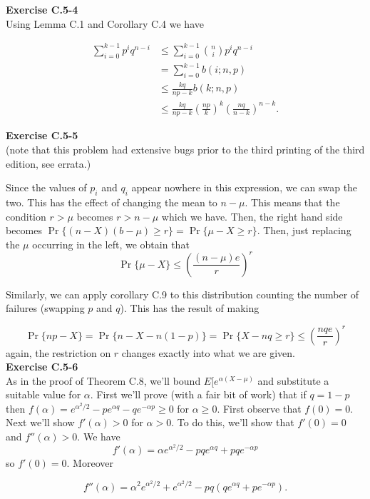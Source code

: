 \documentclass{article}
\begin{document}
\noindent\textbf{Exercise C.5-4}\\

Using Lemma C.1 and Corollary C.4 we have 

\begin{align*} 
\sum_{i=0}^{k-1} p^iq^{n-i} &\leq \sum_{i=0}^{k-1} {n \choose i}p^iq^{n-i} \\
&= \sum_{i=0}^{k-1}b(i;n,p) \\
&\leq \frac{kq}{np-k}b(k;n,p) \\
&\leq \frac{kq}{np-k}\left(\frac{np}{k}\right)^k \left(\frac{nq}{n-k}\right)^{n-k}.
\end{align*}

\noindent\textbf{Exercise C.5-5}\\

(note that this problem had extensive bugs prior to the third printing of the third edition, see errata.)

Since the values of $p_i$ and $q_i$ appear nowhere in this expression, we can swap the two. This has the effect of changing the mean to $n-\mu$. This means that the condition $r>\mu$ becomes $r > n-\mu$ which we have. Then, the right hand side becomes $\Pr\{(n-X) (b-\mu)\ge r\} = \Pr\{\mu-X \ge r\}$. Then, just replacing the $\mu$ occurring in the left, we obtain that
\[
\Pr\{\mu- X\} \le \left(\frac{(n-\mu)e}{r}\right)^r
\]

Similarly, we can apply corollary C.9 to this distribution counting the number of failures (swapping $p$ and $q$). This has the result of making

\[
\Pr\{ np -X\} =  \Pr\{ n - X - n(1-p)\} = \Pr\{X - nq\ge r\}   \le \left(\frac{nqe}{r}\right)^r
\]
again, the restriction on $r$ changes exactly into what we are given.\\

\noindent\textbf{Exercise C.5-6}\\

As in the proof of Theorem C.8, we'll bound $E[e^{\alpha(X-\mu)}$ and substitute a suitable value for $\alpha$.  First we'll prove (with a fair bit of work) that if $q = 1-p$ then $f(\alpha) = e^{\alpha^2/2} - pe^{\alpha q} - qe^{-\alpha p} \geq 0$ for $\alpha \geq 0$.  First observe that $f(0) = 0$.  Next we'll show $f'(\alpha) > 0$ for $\alpha > 0$.  To do this, we'll show that $f'(0) = 0$ and $f''(\alpha) > 0$.  We have
\[f'(\alpha) = \alpha e^{\alpha^2/2} - pqe^{\alpha q} + pqe^{-\alpha p} \]
so $f'(0) = 0$.  Moreover

\[ f''(\alpha) = \alpha^2e^{\alpha^2/2} + e^{\alpha^2/2} - pq(qe^{\alpha q} + pe^{-\alpha p}).\]
\end{document}
